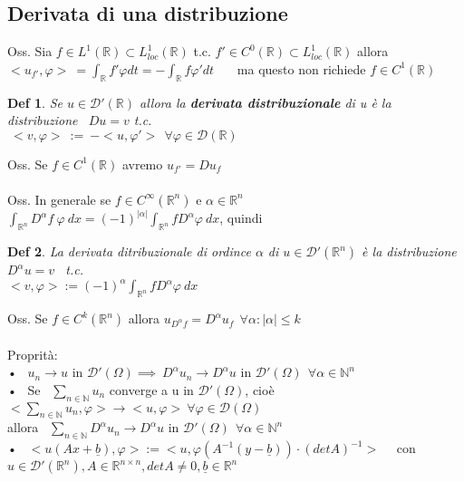 \documentclass{article}
\theoremstyle{unnumbered}
\newtheorem* {theoremT}{Def}
\theoremstyle{unnumbered1}
\newenvironment{defi}{\begin{gBox}\begin{theoremT}}{\end{theoremT}\end{gBox}}
\renewcommand{\phi}{\varphi}
\begin{document}
\subsection{Derivata di una distribuzione}

Oss. Sia $f\in L^1(\mathbb{R})\subset L^1_{loc}(\mathbb{R})$ t.c. $f'\in C^0(\mathbb{R})\subset L^1_{loc}(\mathbb{R})$ allora\\
$<u_{f'},\phi>\ =\int_{\mathbb{R}}f'\phi dt = - \int_{\mathbb{R}} f \phi' dt$ \ \ \ ma questo non richiede $f\in C^1(\mathbb{R})$

\begin{defi}
Se $u\in\mathcal{D}'(\mathbb{R})$ allora la \textbf{derivata distribuzionale} di u è la distribuzione \ $Du = v $ t.c.\\ $ \ <v,\phi> \ :=\ -<u,\phi'> \ \ \forall \phi\in \mathcal{D}(\mathbb{R})$
\end{defi}
%
Oss. Se $f\in C^1(\mathbb{R})$ avremo $u_{f'} = Du_f$\\ \\
%
%
Oss. In generale se $f\in C^{\infty}(\mathbb{R}^n)$ e $\alpha\in\mathbb{R}^n$ \ \ $\int_{\mathbb{R}^n}D^{\alpha} f \ \phi \ dx = (-1)^{|\alpha|}\int_{\mathbb{R}^n}fD^{\alpha}\phi \ dx$, quindi
\begin{defi}
La derivata ditribuzionale di ordince $\alpha $ di $u\in\mathcal{D}'(\mathbb{R}^n)$ è la distribuzione $D^{\alpha}u=v$ \ t.c.\\ $<v,\phi>:=(-1)^{\alpha}\int_{\mathbb{R}^n}fD^{\alpha}\phi \ dx$ 
\end{defi}
%
Oss. Se $f\in C^k(\mathbb{R}^n)$ allora $u_{D^{\alpha}f}=D^{\alpha}u_f \ \ \forall \alpha: |\alpha|\le k$ \\ \\
%
%
%
Proprità:\\
• \ $u_n\to u$ in $\mathcal{D}'(\Omega) \implies \ D^{\alpha}u_n\to D^{\alpha}u$ in $\mathcal{D}'(\Omega) \ \ \forall\alpha\in\mathbb{N}^n$\\
• \ Se \ $\sum_{n\in\mathbb{N}}u_n$ converge a u in $\mathcal{D}'(\Omega)$, cioè $<\sum_{n\in\mathbb{N}}u_n,\phi>\to<u,\phi> \ \forall \phi\in\mathcal{D}(\Omega)$\\
\phantom{• \ }allora \ $\sum_{n\in\mathbb{N}}D^{\alpha}u_n \to D^{\alpha}u$ in $\mathcal{D}'(\Omega) \ \ \forall\alpha\in\mathbb{N}^n$\\
• \ $<u(Ax+\underline{b}),\phi>:=<u,\phi(A^{-1}(y-\underline{b}))\cdot(detA)^{-1}>$ \ \ con $u\in\mathcal{D}'(\mathbb{R}^n), A\in\mathbb{R}^{n\times n}, detA\ne 0, \underline{b}\in\mathbb{R}^n$\\
\end{document}
